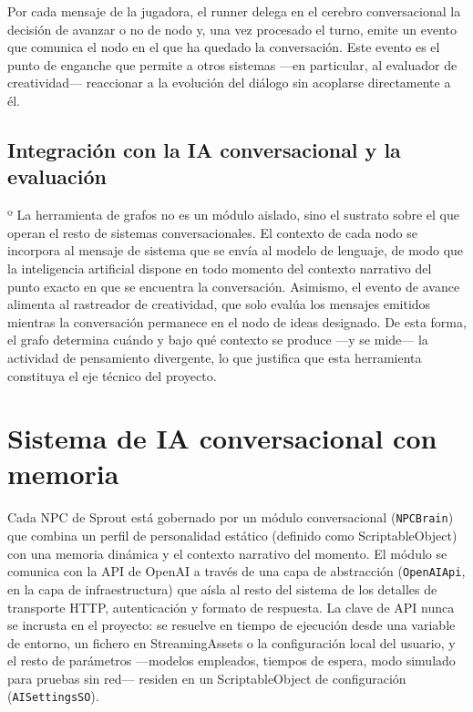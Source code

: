 \documentclass[12pt,twoside,titlepage]{report}
\begin{document}
Por cada mensaje de la jugadora, el runner delega en el cerebro conversacional la decisión de avanzar o no de nodo y, una vez procesado el turno, emite un evento que comunica el nodo en el que ha quedado la conversación. Este evento es el punto de enganche que permite a otros sistemas —en particular, al evaluador de creatividad— reaccionar a la evolución del diálogo sin acoplarse directamente a él.

\subsection{Integración con la IA conversacional y la evaluación}

º   La herramienta de grafos no es un módulo aislado, sino el sustrato sobre el que operan el resto de sistemas conversacionales. El contexto de cada nodo se incorpora al mensaje de sistema que se envía al modelo de lenguaje, de modo que la inteligencia artificial dispone en todo momento del contexto narrativo del punto exacto en que se encuentra la conversación. Asimismo, el evento de avance alimenta al rastreador de creatividad, que solo evalúa los mensajes emitidos mientras la conversación permanece en el nodo de ideas designado. De esta forma, el grafo determina cuándo y bajo qué contexto se produce ---y se mide--- la actividad de pensamiento divergente, lo que justifica que esta herramienta constituya el eje técnico del proyecto.

\section{Sistema de IA conversacional con memoria}

Cada NPC de Sprout está gobernado por un módulo conversacional (\texttt{NPCBrain}) que combina un perfil de personalidad estático (definido como ScriptableObject) con una memoria dinámica y el contexto narrativo del momento. El módulo se comunica con la API de OpenAI a través de una capa de abstracción (\texttt{OpenAIApi}, en la capa de infraestructura) que aísla al resto del sistema de los detalles de transporte HTTP, autenticación y formato de respuesta. La clave de API nunca se incrusta en el proyecto: se resuelve en tiempo de ejecución desde una variable de entorno, un fichero en StreamingAssets o la configuración local del usuario, y el resto de parámetros ---modelos empleados, tiempos de espera, modo simulado para pruebas sin red--- residen en un ScriptableObject de configuración (\texttt{AISettingsSO}).
\end{document}
